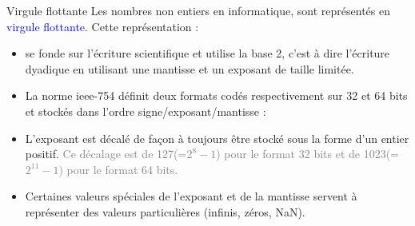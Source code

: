 \documentclass[10pt]{beamer}
\begin{document}
\begin{frame}{\Ctitle}{\stitle}
	\begin{alertblock}{Virgule flottante}
		Les nombres non entiers en informatique, sont représentés en  \textcolor{blue}{virgule flottante}. Cette représentation :
		\begin{itemize}
			\item<1-> se fonde sur l'écriture scientifique et utilise la base 2, c'est à dire l'écriture dyadique en utilisant une mantisse et un exposant de taille limitée.
			\item<2-> La norme {\sc ieee-754} définit deux formats codés respectivement sur 32 et 64 bits et stockés dans l'ordre signe/exposant/mantisse : \\
            \item<4->L'exposant est décalé de façon à toujours être stocké sous la forme d'un entier positif. \textcolor{gray}{Ce décalage est de 127(=$2^8-1$) pour le format 32 bits et de 1023(=$2^{11}-1$) pour le format 64 bits.}
            \item<5-> Certaines valeurs spéciales de l'exposant et de la mantisse servent à représenter des valeurs particulières (infinis, zéros, NaN).
		\end{itemize}
	\end{alertblock}
\end{frame}
\end{document}
